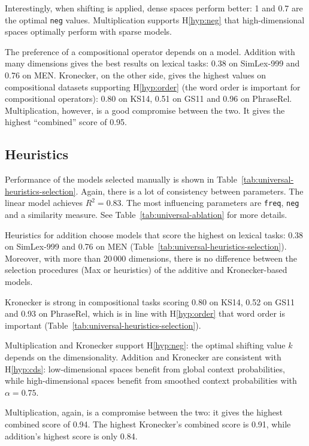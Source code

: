 Interestingly, when shifting is applied, dense spaces perform better: 1 and 0.7 are the optimal \texttt{neg} values. Multiplication supports H\ref{hyp:neg} that high-dimensional spaces optimally perform with sparse models.



The preference of a compositional operator depends on a model. Addition with many dimensions gives the best results on lexical tasks: 0.38 on SimLex-999 and 0.76 on MEN. Kronecker, on the other side, gives the highest values on compositional datasets supporting H\ref{hyp:order} (the word order is important for compositional operators): 0.80 on KS14, 0.51 on GS11 and 0.96 on PhraseRel. Multiplication, however, is a good compromise between the two. It gives the highest ``combined'' score of 0.95.

\subsection{Heuristics}
\label{sec:heuristics-universal}

Performance of the models selected manually is shown in Table~\ref{tab:universal-heuristics-selection}. Again, there is a lot of consistency between parameters. The linear model achieves $R^2 = 0.83$. The most influencing parameters are \texttt{freq}, \texttt{neg} and a similarity measure. See Table~\ref{tab:universal-ablation} for more details.

Heuristics for addition choose models that score the highest on lexical tasks: 0.38 on SimLex-999 and 0.76 on MEN (Table~\ref{tab:universal-heuristics-selection}). Moreover, with more than 20\,000 dimensions, there is no difference between the selection procedures (Max or heuristics) of the additive and Kronecker-based models.

Kronecker is strong in compositional tasks scoring 0.80 on KS14, 0.52 on GS11 and 0.93 on PhraseRel, which is in line with H\ref{hyp:order} that word order is important (Table~\ref{tab:universal-heuristics-selection}).

Multiplication and Kronecker support H\ref{hyp:neg}: the optimal shifting value $k$ depends on the dimensionality. Addition and Kronecker are consistent with H\ref{hyp:cds}: low-dimensional spaces benefit from global context probabilities, while high-dimensional spaces benefit from smoothed context probabilities with $\alpha=0.75$.

Multiplication, again, is a compromise between the two: it gives the highest combined score of 0.94. The highest Kronecker's combined score is 0.91, while addition's highest score is only 0.84.

